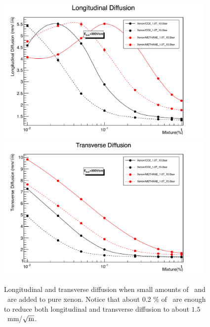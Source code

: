 \documentclass{JINST}
\begin{document}
\begin{figure}[!htb]
\centering
\includegraphics[width=0.95\textwidth]{img/Longitudinal_Diffusion300Vcm.pdf}
\includegraphics[width=0.95\textwidth]{img/Transverse_Diffusion300Vcm.pdf}
\caption{\label{fig.DIF}Longitudinal and transverse diffusion when small amounts of \COT\ and \CHF\ are added to pure xenon. Notice that about 0.2 \% of \COT\ are enough to reduce both longitudinal and transverse diffusion to about $1.5$~mm/$\sqrt{\rm{m}}$.}
\end{figure}
\end{document}

